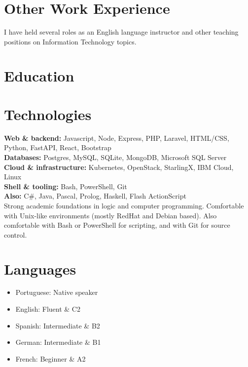 \documentclass[11pt,a4paper,sans]{moderncv}
\begin{document}
\section{Other Work Experience}
I have held several roles as an English language instructor and other teaching positions on Information Technology topics.

\section{Education}

\section{Technologies}
\textbf{Web \& backend:} Javascript, Node, Express, PHP, Laravel, HTML/CSS, Python, FastAPI, React, Bootstrap\\
\textbf{Databases:} Postgres, MySQL, SQLite, MongoDB, Microsoft SQL Server\\
\textbf{Cloud \& infrastructure:} Kubernetes, OpenStack, StarlingX, IBM Cloud, Linux\\
\textbf{Shell \& tooling:} Bash, PowerShell, Git\\
\textbf{Also:} C\#, Java, Pascal, Prolog, Haskell, Flash ActionScript\\
Strong academic foundations in logic and computer programming. Comfortable with Unix-like environments (mostly RedHat and Debian based). Also comfortable with Bash or PowerShell for scripting, and with Git for source control.

\section{Languages}
\begin{itemize}
\item Portuguese: Native speaker
\item English: Fluent \& C2
\item Spanish: Intermediate \& B2
\item German: Intermediate \& B1
\item French: Beginner \& A2
\end{itemize}
\end{document}
